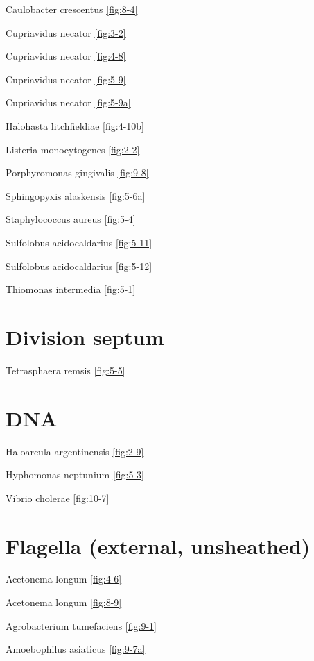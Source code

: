 \documentclass[]{tufte-book}
\begin{document}
Caulobacter crescentus \ref{fig:8-4}

Cupriavidus necator \ref{fig:3-2}

Cupriavidus necator \ref{fig:4-8}

Cupriavidus necator \ref{fig:5-9}

Cupriavidus necator \ref{fig:5-9a}

Halohasta litchfieldiae \ref{fig:4-10b}

Listeria monocytogenes \ref{fig:2-2}

Porphyromonas gingivalis \ref{fig:9-8}

Sphingopyxis alaskensis \ref{fig:5-6a}

Staphylococcus aureus \ref{fig:5-4}

Sulfolobus acidocaldarius \ref{fig:5-11}

Sulfolobus acidocaldarius \ref{fig:5-12}

Thiomonas intermedia \ref{fig:5-1}

\hypertarget{division-septum}{%
\section*{Division septum}\label{division-septum}}

Tetrasphaera remsis \ref{fig:5-5}

\hypertarget{dna-1}{%
\section*{DNA}\label{dna-1}}

Haloarcula argentinensis \ref{fig:2-9}

Hyphomonas neptunium \ref{fig:5-3}

Vibrio cholerae \ref{fig:10-7}

\hypertarget{flagella-external-unsheathed}{%
\section*{Flagella (external, unsheathed)}\label{flagella-external-unsheathed}}

Acetonema longum \ref{fig:4-6}

Acetonema longum \ref{fig:8-9}

Agrobacterium tumefaciens \ref{fig:9-1}

Amoebophilus asiaticus \ref{fig:9-7a}
\end{document}
